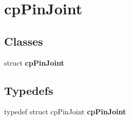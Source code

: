 \hypertarget{group__cp_pin_joint}{\section{cp\-Pin\-Joint}
\label{group__cp_pin_joint}
}
\subsection*{Classes}
\begin{DoxyCompactItemize}
\item 
struct {\bfseries cp\-Pin\-Joint}
\end{DoxyCompactItemize}
\subsection*{Typedefs}
\begin{DoxyCompactItemize}
\item 
\hypertarget{group__cp_pin_joint_gadf4d190124a571ac9eabbaeb61b6d8f3}{typedef struct cp\-Pin\-Joint {\bfseries cp\-Pin\-Joint}}\label{group__cp_pin_joint_gadf4d190124a571ac9eabbaeb61b6d8f3}

\end{DoxyCompactItemize}
